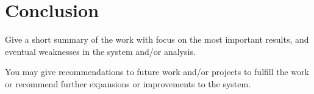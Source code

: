 \section{Conclusion}
Give a short summary of the work with focus on the most important results, and eventual weaknesses in the system and/or analysis.

You may give recommendations to future work and/or projects to fulfill the work or recommend further expansions or improvements to the system.

\pagebreak